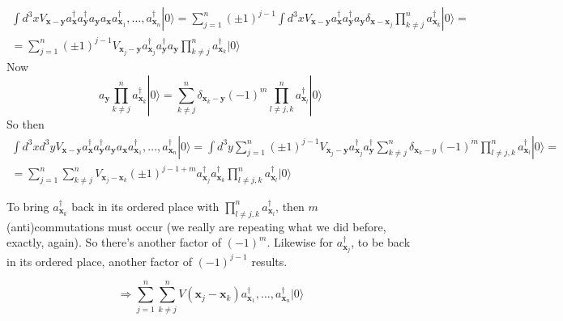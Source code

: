 \documentclass[twoside]{amsart}
\begin{document}
\[
\begin{gathered}
  \int d^3x V_{\mathbf{x} - \mathbf{y}} a_{\mathbf{x}}^{\dag} a^{\dag}_{\mathbf{y}} a_{\mathbf{y}} a_{\mathbf{x}} a^{\dag}_{\mathbf{x}_1} , \dots , a^{\dag}_{\mathbf{x}_n} | 0 \rangle = \sum_{j=1}^n ( \pm 1)^{j-1} \int d^3x V_{\mathbf{x} - \mathbf{y}} a^{\dag}_{\mathbf{x}} a^{\dag}_{\mathbf{y}} a_{\mathbf{y}} \delta_{\mathbf{x} - \mathbf{x}_j} \prod_{ k \neq j }^n a_{\mathbf{x}_k}^{\dag} | 0 \rangle  = \\
  = \sum_{j=1}^n (\pm 1)^{j-1} V_{\mathbf{x}_j - \mathbf{y} } a^{\dag}_{\mathbf{x}_j } a^{\dag}_{\mathbf{y}} a_{\mathbf{y}} \prod_{ k \neq j}^n a_{\mathbf{x}_k}^{\dag} | 0 \rangle
\end{gathered}
\]
Now
\[
a_{ \mathbf{y}} \prod_{k \neq j }^n a_{\mathbf{x}_k}^{\dag} | 0 \rangle = \sum_{k \neq j }^n \delta_{\mathbf{x}_k - \mathbf{y}} (-1)^m  \prod_{l \neq j,k }^n a^{\dag}_{\mathbf{x}_l } | 0 \rangle 
\]
So then
\[
\begin{gathered}
  \int d^3x d^3y V_{\mathbf{x} - \mathbf{y} } a^{\dag}_{\mathbf{x}} a^{\dag}_{\mathbf{y}} a_{\mathbf{y}} a_{\mathbf{x}} a^{\dag}_{\mathbf{x}_1} , \dots , a^{\dag}_{\mathbf{x}_n } | 0 \rangle = \int d^3 y \sum_{j=1}^n (\pm 1)^{j-1} V_{\mathbf{x}_j - \mathbf{y}} a^{\dag}_{\mathbf{x}_j } a^{\dag}_{\mathbf{y}} \sum_{k \neq j }^n \delta_{\mathbf{x}_k - y} (-1)^m \prod_{l \neq j,k }^n a^{ \dag}_{\mathbf{x}_l} | 0 \rangle = \\
  = \sum_{j=1}^n \sum_{ k \neq j }^n V_{\mathbf{x}_j - \mathbf{x}_k } (\pm 1 )^{j-1 + m } a^{\dag}_{\mathbf{x}_j } a_{\mathbf{x}_k}^{\dag} \prod_{l \neq j,k}^n a^{\dag}_{\mathbf{x}_l} | 0 \rangle
\end{gathered}
\]

To bring $a_{\mathbf{x}_k}^{\dag}$ back in its ordered place with $\prod_{l \neq j,k}^n a^{\dag}_{\mathbf{x}_l}$, then $m$ (anti)commutations must occur (we really are repeating what we did before, exactly, again).  So there's another factor of $(-1)^m$.  Likewise for $a^{\dag}_{\mathbf{x}_j}$, to be back in its ordered place, another factor of $(-1)^{j-1}$ results.  

\[
\Longrightarrow \sum_{j=1}^n \sum_{k \neq j}^n V(\mathbf{x}_j - \mathbf{x}_k) a^{\dag}_{\mathbf{x}_1} , \dots, a_{\mathbf{x}_n}^{\dag} | 0 \rangle
\]
\end{document}
